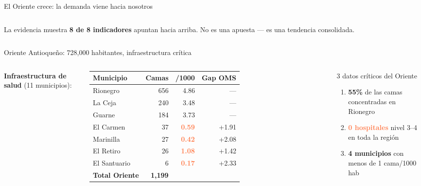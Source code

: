 \documentclass[aspectratio=169, 11pt]{beamer}
\newcommand{\danger}[1]{\textcolor{coral}{\textbf{#1}}}
\newcommand{\src}[1]{\par\vspace{2pt}{\tiny\textcolor{slate}{Fuente: #1}}}
\begin{document}
{\begin{frame}{El Oriente crece: la demanda viene hacia nosotros}
\begin{columns}[T]
\vspace{6pt}
\begin{exampleblock}{\small La evidencia muestra}
\footnotesize \textbf{8 de 8 indicadores} apuntan hacia arriba. No es una apuesta --- es una tendencia consolidada.
\end{exampleblock}
\end{columns}
\end{frame}
}

{
\begin{frame}{Oriente Antioqueño: 728,000 habitantes, infraestructura crítica}

\begin{columns}[T]
\vspace{2pt}
{\small\textbf{Infraestructura de salud} (11 municipios):}

\vspace{4pt}
{\scriptsize
\begin{tabular}{@{}lrrr@{}}
\toprule
\textbf{Municipio} & \textbf{Camas} & \textbf{/1000} & \textbf{Gap OMS} \\
\midrule
\rowcolor{teal!6}
Rionegro & 656 & 4.86 & --- \\
La Ceja & 240 & 3.48 & --- \\
Guarne & 184 & 3.73 & --- \\
\rowcolor{coral!10}
El Carmen & 37 & \danger{0.59} & +1.91 \\
\rowcolor{coral!10}
Marinilla & 27 & \danger{0.42} & +2.08 \\
\rowcolor{coral!10}
El Retiro & 26 & \danger{1.08} & +1.42 \\
\rowcolor{coral!10}
El Santuario & 6 & \danger{0.17} & +2.33 \\
\midrule
\textbf{Total Oriente} & \textbf{1,199} & & \\
\bottomrule
\end{tabular}
}

\vspace{4pt}
\src{REPS capacidad instalada (b4dp-ximh), DANE est.\ 2026}

\vspace{2pt}
\begin{alertblock}{\small 3 datos críticos del Oriente}
\footnotesize
\begin{enumerate}\setlength{\itemsep}{0pt}\setlength{\parskip}{0pt}
  \item \textbf{55\%} de las camas concentradas en Rionegro
  \item \danger{0 hospitales} nivel 3--4 en toda la región
  \item \textbf{4 municipios} con menos de 1 cama/1000 hab
\end{enumerate}


\end{alertblock}
\end{columns}
\end{frame}}
\end{document}
